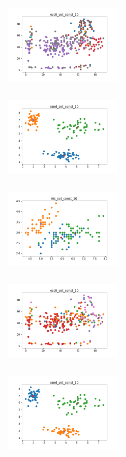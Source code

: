 \begin{figure}[H]
    \hfill
    \begin{subfigure}
        \centering
        \includegraphics[width=0.32\textwidth]{img/copkm2/ecoli_set_const_10_589741062_clust.png}
    \end{subfigure}
    \hfill
    \begin{subfigure}
        \centering
        \includegraphics[width=0.32\textwidth]{img/copkm2/rand_set_const_10_589741062_clust.png}
    \end{subfigure}
    \hfill
    \begin{subfigure}
        \centering
        \includegraphics[width=0.32\textwidth]{img/copkm2/iris_set_const_10_277451237_clust.png}
    \end{subfigure}
    \hfill
    \begin{subfigure}
        \centering
        \includegraphics[width=0.32\textwidth]{img/copkm2/ecoli_set_const_10_277451237_clust.png}
    \end{subfigure}
    \hfill
    \begin{subfigure}
        \centering
        \includegraphics[width=0.32\textwidth]{img/copkm2/rand_set_const_10_277451237_clust.png}

\end{subfigure}
\end{figure}
